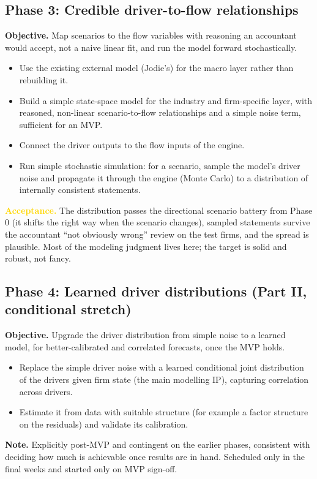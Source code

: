 \documentclass[11pt]{article}
\newcommand{\lead}[2]{\par\addvspace{5pt}\textbf{\textcolor{#1}{#2}}}
\begin{document}
\subsection{Phase 3: Credible driver-to-flow relationships}
\lead{navytwo}{Objective.} Map scenarios to the flow variables with reasoning an accountant would accept, not a naive linear fit, and run the model forward stochastically.
\begin{itemize}
  \item Use the existing external model (Jodie's) for the macro layer rather than rebuilding it.
  \item Build a simple state-space model for the industry and firm-specific layer, with reasoned, non-linear scenario-to-flow relationships and a simple noise term, sufficient for an MVP.
  \item Connect the driver outputs to the flow inputs of the engine.
  \item Run simple stochastic simulation: for a scenario, sample the model's driver noise and propagate it through the engine (Monte Carlo) to a distribution of internally consistent statements.
\end{itemize}
\lead{gold}{Acceptance.} The distribution passes the directional scenario battery from Phase 0 (it shifts the right way when the scenario changes), sampled statements survive the accountant ``not obviously wrong'' review on the test firms, and the spread is plausible. Most of the modeling judgment lives here; the target is solid and robust, not fancy.

\subsection{Phase 4: Learned driver distributions (Part II, conditional stretch)}
\lead{navytwo}{Objective.} Upgrade the driver distribution from simple noise to a learned model, for better-calibrated and correlated forecasts, once the MVP holds.
\begin{itemize}
  \item Replace the simple driver noise with a learned conditional joint distribution of the drivers given firm state (the main modelling IP), capturing correlation across drivers.
  \item Estimate it from data with suitable structure (for example a factor structure on the residuals) and validate its calibration.
\end{itemize}
\lead{navytwo}{Note.} Explicitly post-MVP and contingent on the earlier phases, consistent with deciding how much is achievable once results are in hand. Scheduled only in the final weeks and started only on MVP sign-off.
\end{document}
